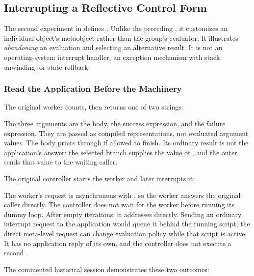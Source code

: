 \subsection{Interrupting a Reflective Control Form}
\label{sec:interrupt}

The second experiment in 
defines . Unlike the preceding , it
customizes an individual object's metaobject rather than the group's
evaluator. It illustrates \emph{abandoning} an evaluation and selecting
an alternative result. It is not an operating-system interrupt handler,
an exception mechanism with stack unwinding, or state rollback.

\subsubsection{Read the Application Before the Machinery}

The original worker counts, then returns one of two strings:


The three arguments are the body, the success expression, and the
failure expression. They are passed as compiled representations, not
evaluated argument values. The body prints  through
 if allowed to finish. Its ordinary 
result is not the application's answer: the selected branch supplies
the value of , and the outer \code{!} sends that
value to the waiting caller.

The original controller starts the worker and later interrupts it:


The worker's request is asynchronous with , so the worker
answers the original caller directly. The controller does not wait for
the worker before running its dummy loop. After  empty iterations,
it addresses  directly. Sending an
ordinary interrupt request to the application would queue it behind
the running script; the direct meta-level request can change evaluation
policy while that script is active. It has no application reply of its
own, and the controller does not execute a second \code{!}.

The commented historical session demonstrates these two outcomes:

